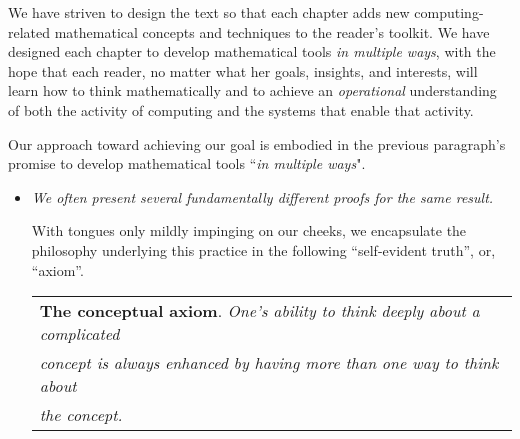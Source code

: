 \smallskip

We have striven to design the text so that each chapter adds new computing-related mathematical concepts and techniques to the reader's toolkit.  We have designed each chapter to develop mathematical tools {\em in multiple ways}, with the hope that each reader, no matter what her goals, insights, and interests, will learn how to think mathematically and to achieve an {\em operational} understanding of both the activity of computing and the systems that enable that activity.

\smallskip

Our approach toward achieving our goal is embodied in the previous paragraph's promise to develop mathematical tools ``{\em in multiple ways}".
\begin{itemize}
\item
{\em We often present several fundamentally different proofs for the same result.}

\smallskip

With tongues only mildly impinging on our cheeks, we encapsulate the philosophy underlying this practice in the following ``self-evident truth'', or, ``axiom''. 

\medskip

\hspace*{.2in}\begin{tabular}{l}
{\bf The conceptual axiom}.
{\em One's ability to think deeply about a complicated } \\
{\em concept is always enhanced by having more than one way to think about} \\
{\em the concept.}
\end{tabular}

\medskip


\end{itemize}
